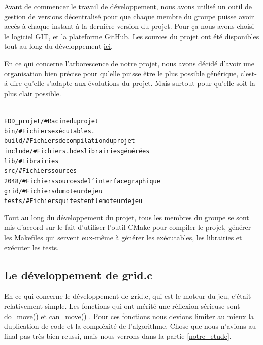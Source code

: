 \documentclass[12pt]{article}
\begin{document}
Avant de commencer le travail de d\'eveloppement, nous avons utilis\'e un
outil de gestion de versions d\'ecentralis\'e pour que chaque membre du groupe
puisse avoir acc\'es \`a chaque instant \`a la derni\`ere version du projet.
Pour ça nous avons choisi le logiciel \href{http://git-scm.com/}{GIT}, et la plateforme
\href{http://github.com/}{GitHub}. Les sources du projet ont \'et\'e disponibles tout
au long du d\'eveloppement \href{http://github.com/kamneo/EDD_project}{ici}.\par

En ce qui concerne l'arborescence de notre projet, nous avons d\'ecid\'e d'avoir
une organisation bien pr\'ecise pour qu'elle puisse \^etre le plus possible
g\'en\'erique, c'est-\'a-dire qu'elle s'adapte aux \'evolutions du projet.
Mais surtout pour qu'elle soit la plus clair possible.

\begin{alltt}
{\color{gray}
EDD_projet/        # Racine du projet
    bin/           # Fichiers ex\'ecutables.
    build/         # Fichiers de compilation du projet
    include/       # Fichiers .h des librairies g\'en\'er\'ees
    lib/           # Librairies
    src/           # Fichiers sources
        2048/      # Fichiers sources de l'interface graphique
        grid/      # Fichiers du moteur de jeu
            tests/ # Fichiers qui testent le moteur de jeu
}
\end{alltt}

\par

Tout au long du d\'eveloppement du projet, tous les membres du groupe se sont
mis d'accord sur le fait d'utiliser l'outil \href{http://www.cmake.org/}{CMake}
pour compiler le projet, g\'en\'erer les Makefiles qui servent eux-m\^eme \`a g\'en\'erer les
ex\'ecutables, les librairies et ex\'ecuter les tests.

\subsection{Le développement de grid.c}
En ce qui concerne le d\'eveloppement de grid.c, qui est le moteur du jeu,
c'était relativement simple. Les fonctions qui ont m\'erit\'e une r\'eflexion
s\'erieuse sont \og do\_move() \fg{} et \og can\_move() \fg{}. Pour ces
fonctions nous devions limiter au mieux la duplication de code et la compl\'exit\'e de
l'algorithme. Chose que nous n'avions au final pas tr\`es bien reussi, mais nous
verrons dans la partie \ref{notre_etude}.
\end{document}
